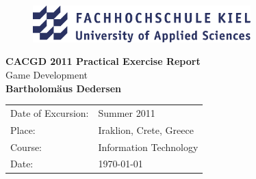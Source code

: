 \documentclass[bibtotocnumbered, headsepline,normalheadings,12pt]{report}
\begin{document}
\begin{titlepage}
\thispagestyle{empty}
 \begin{center}
 \begin{figure}[htbp]
    \centering
     \includegraphics[width=0.75\textwidth]{fhkiel.png} 
\end{figure}

  \vspace*{2.5cm}
 {\bf \huge CACGD 2011 Practical Exercise Report}
 \vspace*{1cm} \\
 {\Large Game Development\\}
 \vspace{0.5cm}
 {\Large \bfseries Bartholomäus Dedersen\\}
 \vfill
  \vspace*{1.5cm}
\begin{table}[h]
    \centering
    \begin{tabular}{l l}
        Date of Excursion: & Summer 2011 \\ 
        Place: & Iraklion, Crete, Greece \\ 
        Course: & Information Technology \\
        Date: & \today\\
    \end{tabular}
\end{table}

 \end{center}
\end{titlepage}


\begin{abstract}

    In this report about the practical part of the ``Computational Aspects of Computer Games Development'' programme for two weeks in Crete a
    game programming with the Python programming language is described. The controller is a neural interface for brainwave wavelength reception 
    through three skin-applied electrodes. The game is themed after a fictional Cretan Zombie incursion after the actual event.

\end{abstract}

\tableofcontents \newpage
\end{document}
